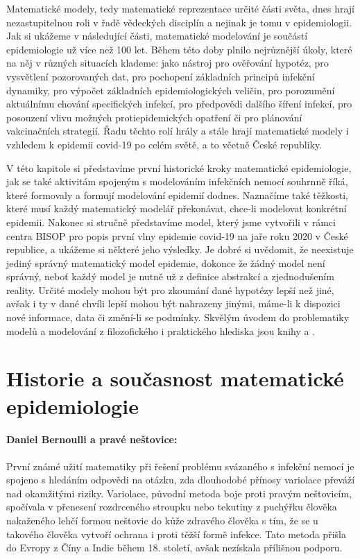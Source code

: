 Matematické modely, tedy matematické reprezentace určité části světa, dnes hrají nezastupitelnou roli v řadě vědeckých disciplín a nejinak je tomu v epidemiologii. Jak si ukážeme v následující části, matematické modelování je součástí epidemiologie už více než 100 let. Během této doby plnilo nejrůznější úkoly, které na něj v různých situacích klademe: jako nástroj pro ověřování hypotéz, pro vysvětlení pozorovaných dat, pro pochopení základních principů infekční dynamiky, pro výpočet základních epidemiologických veličin, pro porozumění aktuálnímu chování specifických infekcí, pro předpovědi dalšího šíření infekcí, pro posouzení vlivu možných protiepidemických opatření či pro plánování vakcinačních strategií. Řadu těchto rolí hrály a stále hrají matematické modely i vzhledem k epidemii covid-19 po celém světě, a to včetně České republiky.

V této kapitole si představíme první historické kroky matematické epidemiologie, jak se také aktivitám spojeným s modelováním infekčních nemocí souhrnně říká, které formovaly a formují modelování epidemií dodnes. Naznačíme také těžkosti, které musí každý matematický modelář překonávat, chce-li modelovat konkrétní epidemii. Nakonec si stručně představíme model, který jsme vytvořili v rámci centra BISOP pro popis první vlny epidemie covid-19 na jaře roku 2020 v České republice, a ukážeme si některé jeho výsledky. Je dobré si uvědomit, že neexistuje jediný správný matematický model epidemie, dokonce že žádný model není správný, neboť každý model je nutně už z definice abstrakcí a zjednodušením reality. Určité modely mohou být pro zkoumání dané hypotézy lepší než jiné, avšak i ty v dané chvíli lepší mohou být nahrazeny jinými, máme-li k dispozici nové informace, data či změní-li se podmínky. Skvělým úvodem do problematiky modelů a modelování z filozofického i praktického hlediska jsou knihy \cite{GerleeLundh2016} a \cite{HilbornMangel1997}.

\section*{Historie a současnost matematické epidemiologie}


\paragraph{Daniel Bernoulli a pravé neštovice:} První známé užití matematiky při řešení problému svázaného s infekční nemocí je spojeno s hledáním odpovědi na otázku, zda dlouhodobé přínosy variolace převáží nad okamžitými riziky. Variolace, původní metoda boje proti pravým neštovicím, spočívala v přenesení rozdrceného stroupku nebo tekutiny z puchýřku člověka nakaženého lehčí formou neštovic do kůže zdravého člověka s tím, že se u takového člověka vytvoří ochrana i proti těžší formě infekce. Tato metoda přišla do Evropy z Číny a Indie během 18. století, avšak nezískala přílišnou podporu. 


